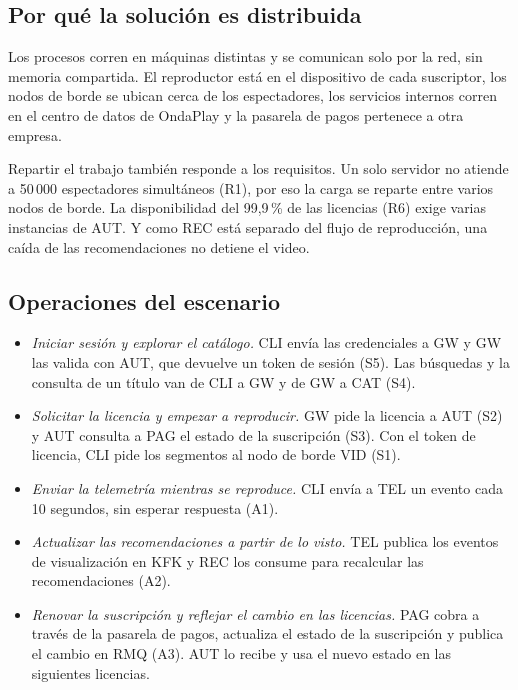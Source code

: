 \subsection{Por qué la solución es distribuida}

Los procesos corren en máquinas distintas y se comunican solo por la
red, sin memoria compartida. El reproductor está en el dispositivo de
cada suscriptor, los nodos de borde se ubican cerca de los
espectadores, los servicios internos corren en el centro de datos de
OndaPlay y la pasarela de pagos pertenece a otra empresa.

Repartir el trabajo también responde a los requisitos. Un solo
servidor no atiende a 50\,000 espectadores simultáneos (R1), por eso
la carga se reparte entre varios nodos de borde. La disponibilidad
del 99,9\,\% de las licencias (R6) exige varias instancias de AUT. Y
como REC está separado del flujo de reproducción, una caída de las
recomendaciones no detiene el video.

\subsection{Operaciones del escenario}

\begin{itemize}
  \item[(a)] \emph{Iniciar sesión y explorar el catálogo.} CLI envía
    las credenciales a GW y GW las valida con AUT, que devuelve un
    token de sesión (S5). Las búsquedas y la consulta de un título van
    de CLI a GW y de GW a CAT (S4).
  \item[(b)] \emph{Solicitar la licencia y empezar a reproducir.} GW
    pide la licencia a AUT (S2) y AUT consulta a PAG el estado de la
    suscripción (S3). Con el token de licencia, CLI pide los segmentos
    al nodo de borde VID (S1).
  \item[(c)] \emph{Enviar la telemetría mientras se reproduce.} CLI
    envía a TEL un evento cada 10 segundos, sin esperar respuesta (A1).
  \item[(d)] \emph{Actualizar las recomendaciones a partir de lo
    visto.} TEL publica los eventos de visualización en KFK y REC los
    consume para recalcular las recomendaciones (A2).
  \item[(e)] \emph{Renovar la suscripción y reflejar el cambio en las
    licencias.} PAG cobra a través de la pasarela de pagos, actualiza
    el estado de la suscripción y publica el cambio en RMQ (A3). AUT lo
    recibe y usa el nuevo estado en las siguientes licencias.
\end{itemize}


